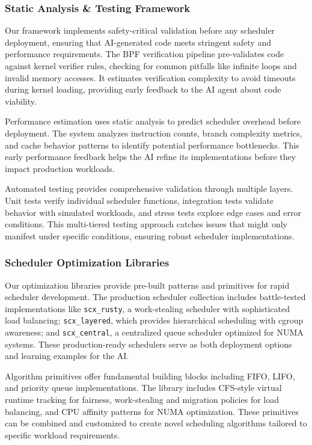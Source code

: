 \subsubsection{Static Analysis \& Testing Framework}
Our framework implements safety-critical validation before any scheduler deployment, ensuring that AI-generated code meets stringent safety and performance requirements. The BPF verification pipeline pre-validates code against kernel verifier rules, checking for common pitfalls like infinite loops and invalid memory accesses. It estimates verification complexity to avoid timeouts during kernel loading, providing early feedback to the AI agent about code viability.

Performance estimation uses static analysis to predict scheduler overhead before deployment. The system analyzes instruction counts, branch complexity metrics, and cache behavior patterns to identify potential performance bottlenecks. This early performance feedback helps the AI refine its implementations before they impact production workloads.

Automated testing provides comprehensive validation through multiple layers. Unit tests verify individual scheduler functions, integration tests validate behavior with simulated workloads, and stress tests explore edge cases and error conditions. This multi-tiered testing approach catches issues that might only manifest under specific conditions, ensuring robust scheduler implementations.

\subsubsection{Scheduler Optimization Libraries}
Our optimization libraries provide pre-built patterns and primitives for rapid scheduler development. The production scheduler collection includes battle-tested implementations like \texttt{scx\_rusty}, a work-stealing scheduler with sophisticated load balancing; \texttt{scx\_layered}, which provides hierarchical scheduling with cgroup awareness; and \texttt{scx\_central}, a centralized queue scheduler optimized for NUMA systems. These production-ready schedulers serve as both deployment options and learning examples for the AI.

Algorithm primitives offer fundamental building blocks including FIFO, LIFO, and priority queue implementations. The library includes CFS-style virtual runtime tracking for fairness, work-stealing and migration policies for load balancing, and CPU affinity patterns for NUMA optimization. These primitives can be combined and customized to create novel scheduling algorithms tailored to specific workload requirements.

